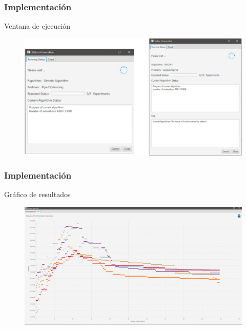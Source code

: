 \documentclass[9pt]{beamer}
\begin{document}
    \begin{frame}
        \frametitle{Implementación}
        Ventana de ejecución               
        \begin{figure}
            \includegraphics[width=\textwidth]{assets/Interfaces/EstadoEjecucion.png}
        \end{figure}
    \end{frame}

    \begin{frame}
        \frametitle{Implementación}
        Gráfico de resultados                  
        \begin{figure}
            \includegraphics[width=\textwidth]{assets/Interfaces/GraficoResultados.png}
        \end{figure}
    \end{frame}
\end{document}
